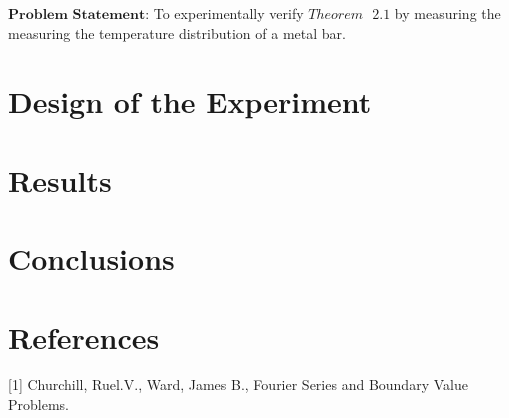 \documentclass{article}
\begin{document}
$\textbf{Problem Statement}$: To experimentally verify $Theorem \text{ }2.1$ by measuring the measuring the temperature distribution of a metal bar. 

\section{Design of the Experiment}



\section{Results}


\section{Conclusions}

\section{References}
[1] Churchill, Ruel.V., Ward, James B., Fourier Series and Boundary Value Problems.


\end{document}
